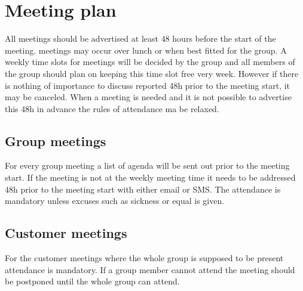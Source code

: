 \section{Meeting plan}
All meetings should be advertised at least 48 hours before the start of the meeting. meetings may occur over lunch or when best fitted for the group. A weekly time slots for meetings will be decided by the group and all members of the group should plan on keeping this time slot free very week. However if there is nothing of importance to discuss reported 48h prior to the meeting start, it may be canceled. When a meeting is needed and it is not possible to advertise this 48h in advance the rules of attendance ma be relaxed.
\subsection{Group meetings}
For every group meeting a list of agenda will be sent out prior to the meeting start. If the meeting is not at the weekly meeting time it needs to be addressed 48h prior to the meeting start with either email or SMS. The attendance is mandatory unless excuses such as sickness or equal is given.
\subsection{Customer meetings}
For the customer meetings where the whole group is supposed to be present attendance is mandatory. If a group member cannot attend the meeting should be postponed until the whole group can attend.